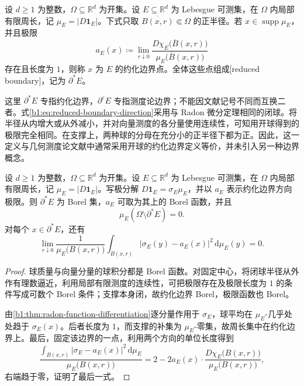 \begin{definition}\label{b1:def:reduced-boundary}
设 \(d\ge1\) 为整数，\(\Omega\subseteq\mathbb R^d\) 为开集。设 \(E\subseteq\mathbb R^d\) 为 Lebesgue 可测集，在 \(\Omega\) 内局部有限周长，记 \(\mu_E=|D\mathbf1_E|\)。下式只取 \(\overline{B(x,r)}\Subset\Omega\) 的正半径。若 \(x\in\operatorname{supp}\mu_E\)，并且极限
\begin{equation}\label{b1:eq:reduced-boundary-direction}
 a_E(x)\coloneqq\lim_{r\downarrow0}
 \frac{D\chi_E\bigl(\overline B(x,r)\bigr)}
 {\mu_E\bigl(\overline B(x,r)\bigr)}
\end{equation}
存在且长度为 \(1\)，则称 \(x\) 为 \(E\) 的约化边界点。全体这些点组成[reduced boundary]，记为 \(\partial^*E\)。
\end{definition}

这里 \(\partial^*E\) 专指约化边界，\(\partial^eE\) 专指测度论边界；不能因文献记号不同而互换二者。式\eqref{b1:eq:reduced-boundary-direction}采用与 Radon 微分定理相同的闭球。将半径从内增大或从外减小，并对向量测度的各分量使用连续性，可知用开球得到的极限完全相同。在支撑上，两种球的分母在充分小的正半径下都为正。因此，这一定义与几何测度论文献中通常采用开球的约化边界定义等价，并未引入另一种边界概念。

\begin{proposition}\label{b1:prop:reduced-boundary-carries-perimeter}
设 \(d\ge1\) 为整数，\(\Omega\subseteq\mathbb R^d\) 为开集。设 \(E\subseteq\mathbb R^d\) 为 Lebesgue 可测集，在 \(\Omega\) 内局部有限周长，记 \(\mu_E=|D\mathbf1_E|\)。写极分解 \(D\mathbf1_E=\sigma_E\mu_E\)，并以 \(a_E\) 表示约化边界方向极限。则 \(\partial^*E\) 为 Borel 集，\(a_E\) 可取为其上的 Borel 函数，并且
\[
 \mu_E(\Omega\setminus\partial^*E)=0.
\]
对每个 \(x\in\partial^*E\)，还有
\begin{equation}\label{b1:eq:reduced-direction-oscillation}
 \lim_{r\downarrow0}
 \frac{1}{\mu_E\bigl(B(x,r)\bigr)}
 \int_{B(x,r)}|\sigma_E(y)-a_E(x)|^2\,\mathrm d\mu_E(y)=0.
\end{equation}
\end{proposition}
\begin{proof}
球质量与向量分量的球积分都是 Borel 函数。对固定中心，将闭球半径从外作有理数逼近，利用局部有限测度的连续性，可把极限存在及极限长度为 \(1\) 的条件写成可数个 Borel 条件；支撑本身闭，故约化边界 Borel，极限函数也 Borel。

由\cref{b1:thm:radon-function-differentiation}逐分量作用于 \(\sigma_E\)，球平均在 \(\mu_E\)-几乎处处趋于 \(\sigma_E(x)\)。后者长度为 \(1\)，而支撑的补集为 \(\mu_E\)-零集，故周长集中在约化边界上。最后，固定该边界的一点，利用两个方向的单位长度得到
\[
 \frac{\int_{B(x,r)}|\sigma_E-a_E(x)|^2\,\mathrm d\mu_E}
 {\mu_E\bigl(B(x,r)\bigr)}
 =2-2a_E(x)\cdot
 \frac{D\chi_E\bigl(B(x,r)\bigr)}{\mu_E\bigl(B(x,r)\bigr)},
\]
右端趋于零，证明了最后一式。
\end{proof}

